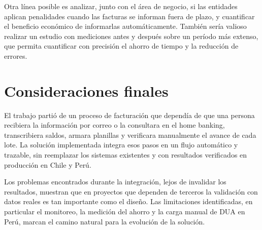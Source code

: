 Otra línea posible es analizar, junto con el área de negocio, si las entidades aplican penalidades cuando las facturas se informan fuera de plazo, y cuantificar el beneficio económico de informarlas automáticamente. También sería valioso realizar un estudio con mediciones antes y después sobre un período más extenso, que permita cuantificar con precisión el ahorro de tiempo y la reducción de errores.

\section{Consideraciones finales}

El trabajo partió de un proceso de facturación que dependía de que una persona recibiera la información por correo o la consultara en el home banking, transcribiera saldos, armara planillas y verificara manualmente el avance de cada lote. La solución implementada integra esos pasos en un flujo automático y trazable, sin reemplazar los sistemas existentes y con resultados verificados en producción en Chile y Perú.

Los problemas encontrados durante la integración, lejos de invalidar los resultados, muestran que en proyectos que dependen de terceros la validación con datos reales es tan importante como el diseño. Las limitaciones identificadas, en particular el monitoreo, la medición del ahorro y la carga manual de DUA en Perú, marcan el camino natural para la evolución de la solución.
